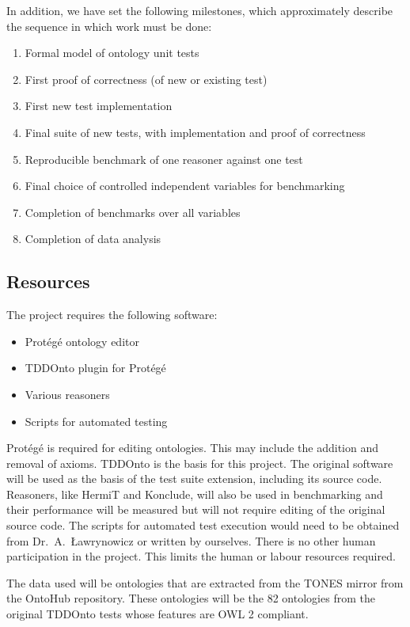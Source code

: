 \documentclass[draft]{sig-alternate}
\begin{document}
In addition, we have set the following milestones, which approximately describe the sequence in which work must be done:
\begin{enumerate}[noitemsep]
  \item Formal model of ontology unit tests
  \item First proof of correctness (of new or existing test)
  \item First new test implementation
  \item Final suite of new tests, with implementation and proof of correctness
  \item Reproducible benchmark of one reasoner against one test
  \item Final choice of controlled independent variables for benchmarking
  \item Completion of benchmarks over all variables
  \item Completion of data analysis
\end{enumerate}

\subsection{Resources}

The project requires the following software:
\begin{itemize}[noitemsep]
  \item Prot\'eg\'e ontology editor
  \item TDDOnto plugin for Prot\'eg\'e
  \item Various reasoners
  \item Scripts for automated testing
\end{itemize}

Prot\'eg\'e is required for editing ontologies. This may include the addition and removal of axioms. TDDOnto is the basis for this project. The original software will be used as the basis of the test suite extension, including its source code. Reasoners, like HermiT and Konclude, will also be used in benchmarking and their performance will be measured but will not require editing of the original source code. The scripts for automated test execution would need to be obtained from Dr.\ A.\ {\L}awrynowicz or written by ourselves. There is no other human participation in the project. This limits the human or labour resources required.

The data used will be ontologies that are extracted from the TONES mirror from the OntoHub repository. These ontologies will be the 82 ontologies from the original TDDOnto tests whose features are OWL 2 compliant.
\end{document}
